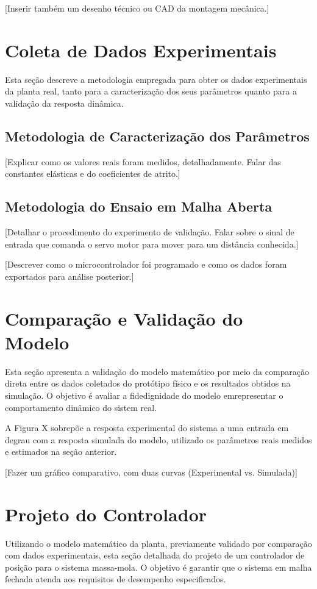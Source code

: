 \documentclass[9pt,a4paper,twocolumn,twoside]{tau-class/tau}
\begin{document}
[Inserir também um desenho técnico ou CAD da montagem mecânica.]

\section{Coleta de Dados Experimentais}
Esta seção descreve a metodologia empregada para obter os dados experimentais da planta real, tanto para a caracterização dos seus parâmetros quanto para a validação da resposta dinâmica.

\subsection{Metodologia de Caracterização dos Parâmetros}

[Explicar como os valores reais foram medidos, detalhadamente. Falar das constantes elásticas e do coeficientes de atrito.]

\subsection{Metodologia do Ensaio em Malha Aberta}
[Detalhar o procedimento do experimento de validação. Falar sobre o sinal de entrada que comanda o servo motor para mover para um distância conhecida.]

[Descrever como o microcontrolador foi programado e como os dados foram exportados para análise posterior.]


\section{Comparação e Validação do Modelo}
Esta seção apresenta a validação do modelo matemático por meio da comparação direta entre os dados coletados do protótipo físico e os resultados obtidos na simulação. O objetivo é avaliar a fidedignidade do modelo emrepresentar o comportamento dinâmico do sistem real.

A Figura X sobrepõe a resposta experimental do sistema a uma entrada em degrau com a resposta simulada do modelo, utilizado os parâmetros reais medidos e estimados na seção anterior.

[Fazer um gráfico comparativo, com duas curvas (Experimental vs. Simulada)]

\section{Projeto do Controlador}
Utilizando o modelo matemático da planta, previamente validado por comparação com dados experimentais, esta seção detalhada do projeto de um controlador de posição para o sistema massa-mola. O objetivo é garantir que o sistema em malha fechada atenda aos requisitos de desempenho especificados.
\end{document}

